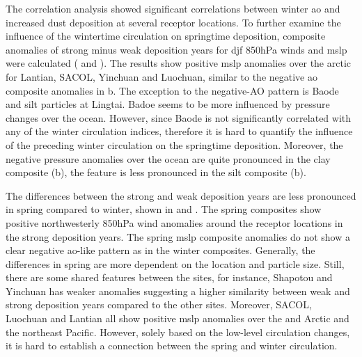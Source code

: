 The correlation analysis showed significant correlations between winter \acrshort{ao} and increased dust deposition at several receptor locations. 
To further examine the influence of the wintertime circulation on springtime deposition,  composite anomalies of strong minus weak deposition years for \acrshort{djf} 850hPa winds and \acrshort{mslp} were calculated ( and ). The results show positive \acrshort{mslp} anomalies over the arctic for Lantian, SACOL, Yinchuan and Luochuan, similar to the negative \acrshort{ao} composite anomalies in b. 
The exception to the negative-AO pattern is Baode and silt particles at Lingtai. Badoe seems to be more influenced by pressure changes over the ocean. However, since Baode is not significantly correlated with any of the winter circulation indices, therefore it is hard to quantify the influence of the preceding winter circulation on the springtime deposition. Moreover, the negative pressure anomalies over the ocean are quite pronounced in the clay composite (b), the feature is less pronounced in the silt composite (b).       

The differences between the strong and weak deposition years are less pronounced in spring compared to winter, shown in  and . 
The spring composites show positive northwesterly 850hPa wind anomalies around the receptor locations in the strong deposition years.
The spring \acrshort{mslp} composite anomalies do not show a clear negative \acrshort{ao}-like pattern as in the winter composites.
Generally, the differences in spring are more dependent on the location and particle size. 
Still, there are some shared features between the sites, for instance, Shapotou and Yinchuan has weaker anomalies suggesting a higher similarity between weak and strong deposition years compared to the other sites.
Moreover, SACOL, Luochuan and Lantian all show positive \acrshort{mslp} anomalies over the and Arctic and the northeast Pacific.
However, solely based on the low-level circulation changes, it is hard to establish a connection between the spring and winter circulation.

